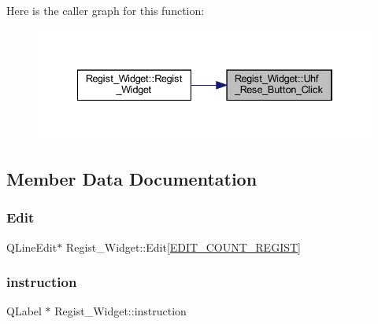 Here is the caller graph for this function\+:
\nopagebreak
\begin{figure}[H]
\begin{center}
\leavevmode
\includegraphics[width=334pt]{class_regist___widget_ab97ea654f98bb920f7777ed2a7495ced_icgraph}
\end{center}
\end{figure}


\subsection{Member Data Documentation}
\mbox{\label{class_regist___widget_a837bd4d13a2230e1569e8f6745733f97}} 
\subsubsection{\texorpdfstring{Edit}{Edit}}
{\footnotesize\ttfamily Q\+Line\+Edit$\ast$ Regist\+\_\+\+Widget\+::\+Edit\mbox{[}\mbox{\hyperlink{regist__widget_8h_a10687a6d03383b36267ecd51b82e2d4e}{E\+D\+I\+T\+\_\+\+C\+O\+U\+N\+T\+\_\+\+R\+E\+G\+I\+ST}}\mbox{]}\hspace{0.3cm}{\ttfamily [private]}}

\mbox{\label{class_regist___widget_ac21f8a7a1a6acd7f43f93ed5ac133681}} 
\subsubsection{\texorpdfstring{instruction}{instruction}}
{\footnotesize\ttfamily Q\+Label $\ast$ Regist\+\_\+\+Widget\+::instruction\hspace{0.3cm}{\ttfamily [private]}}

\mbox{\label{class_regist___widget_a73e4b5f46a7ad046ae33f935b4fd3b46}} 
